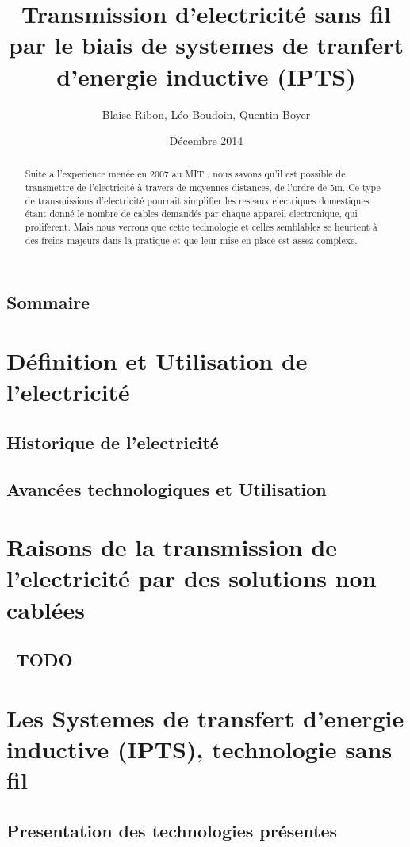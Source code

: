 \documentclass[12pt]{report}
\begin{document}
\title{Transmission d'electricité sans fil par le biais de systemes de tranfert d'energie inductive (IPTS)}
\author{Blaise Ribon, Léo Boudoin, Quentin Boyer}
\date{Décembre 2014}
\maketitle
\begin{abstract}
	Suite a l'experience menée en 2007 au MIT , nous savons qu'il est possible de transmettre de l'electricité à travers de moyennes distances, de l'ordre de 5m. Ce type de transmissions d'electricité pourrait simplifier les reseaux electriques domestiques étant donné le nombre de cables demandés par chaque appareil electronique, qui proliferent. Mais nous verrons que cette technologie et celles semblables se heurtent à des freins majeurs dans la pratique et que leur mise en place est assez complexe.
\end{abstract}
\section{Sommaire}
\chapter{Définition et Utilisation de l'electricité} %
\section{Historique de l'electricité}
\section{Avancées technologiques et Utilisation}
\chapter{Raisons de la transmission de l'electricité par des solutions non cablées} %
\section{--TODO--}
\chapter{Les Systemes de transfert d'energie inductive (IPTS), technologie sans fil} %
\section{Presentation des technologies présentes}
\end{document}
